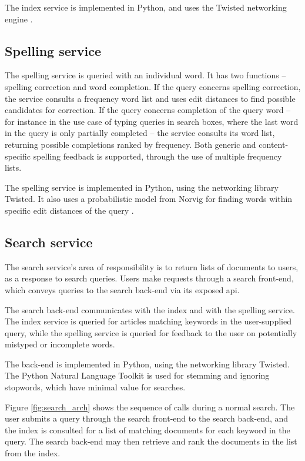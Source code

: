 The index service is implemented in Python, and uses the Twisted networking engine \citep{twisted}.

\subsection{Spelling service}
The spelling service is queried with an individual word. It has two functions -- spelling correction and word completion. 
If the query concerns spelling correction, the service consults a frequency word list and uses edit distances to find possible candidates for correction. 
If the query concerns completion of the query word -- for instance in the use case of typing queries in search boxes, where the last word in the query is only partially completed -- the service consults its word list, returning possible completions ranked by frequency. 
Both generic and content-specific spelling feedback is supported, through the use of multiple frequency lists.

The spelling service is implemented in Python, using the networking library Twisted. It also uses a probabilistic model from Norvig for finding words within specific edit distances of the query \citep{norvig}.

\subsection{Search service}
The search service's area of responsibility is to return lists of documents to users, as a response to search queries. Users make requests through a search front-end, which conveys queries to the search back-end via its exposed \acrshort{api}.

The search back-end communicates with the index and with the spelling service.
The index service is queried for articles matching keywords in the user-supplied query, while the spelling service is queried for feedback to the user on potentially mistyped or incomplete words.

The back-end is implemented in Python, using the networking library Twisted. 
The Python Natural Language Toolkit \citep{nltk} is used for stemming and ignoring stopwords, which have minimal value for searches.

Figure \ref{fig:search_arch} shows the sequence of calls during a normal search. 
The user submits a query through the search front-end to the search back-end, and the index is consulted for a list of matching documents for each keyword in the query. 
The search back-end may then retrieve and rank the documents in the list from the index.

